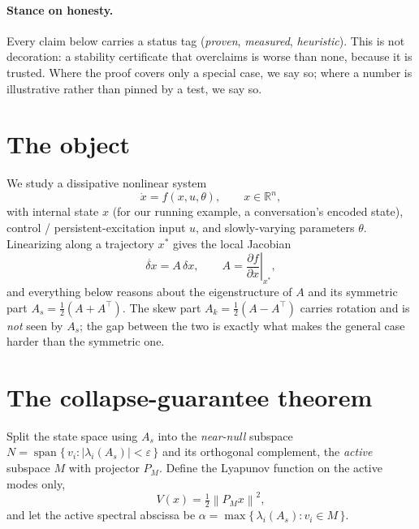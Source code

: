 \documentclass[11pt]{article}
\theoremstyle{definition}
\newcommand{\R}{\mathbb{R}}
\newcommand{\norm}[1]{\left\lVert#1\right\rVert}
\newcommand{\PM}{P_{\!M}}
\begin{document}
\paragraph{Stance on honesty.} Every claim below carries a status tag (\emph{proven},
\emph{measured}, \emph{heuristic}). This is not decoration: a stability certificate that
overclaims is worse than none, because it is trusted. Where the proof covers only a special
case, we say so; where a number is illustrative rather than pinned by a test, we say so.

\section{The object}
\label{sec:object}
We study a dissipative nonlinear system
\begin{equation}
\dot{x} = f(x,u,\theta), \qquad x \in \R^{n},
\end{equation}
with internal state $x$ (for our running example, a conversation's encoded state),
control / persistent-excitation input $u$, and slowly-varying parameters $\theta$.
Linearizing along a trajectory $x^\ast$ gives the local Jacobian
\begin{equation}
\dot{\delta x} = A\,\delta x, \qquad
A = \left.\frac{\partial f}{\partial x}\right|_{x^\ast},
\end{equation}
and everything below reasons about the eigenstructure of $A$ and its symmetric part
$A_s = \tfrac12(A + A^{\top})$. The skew part $A_k=\tfrac12(A-A^\top)$ carries rotation and
is \emph{not} seen by $A_s$; the gap between the two is exactly what makes the general case
harder than the symmetric one.

\section{The collapse-guarantee theorem}
\label{sec:thm}
Split the state space using $A_s$ into the \emph{near-null} subspace
$N = \operatorname{span}\{\, v_i : |\lambda_i(A_s)| < \varepsilon \,\}$ and its orthogonal
complement, the \emph{active} subspace $M$ with projector $\PM$. Define the Lyapunov
function on the active modes only,
\begin{equation}
V(x) = \tfrac12 \norm{\PM x}^2,
\end{equation}
and let the active spectral abscissa be
$\alpha = \max\{\, \lambda_i(A_s) : v_i \in M \,\}$.
\end{document}
